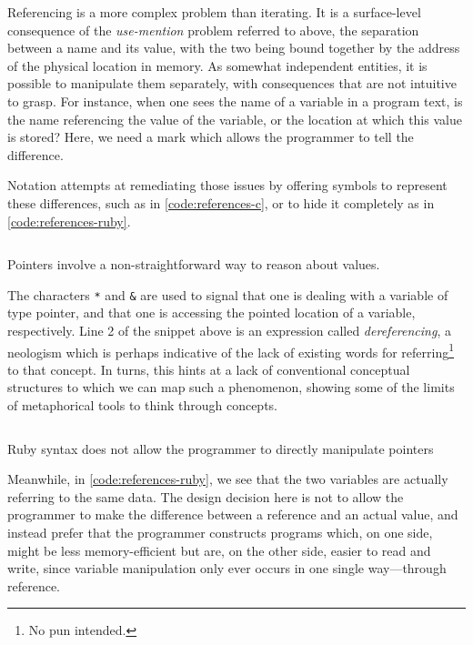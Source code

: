 Referencing is a more complex problem than iterating. It is a surface-level consequence of the \emph{use-mention} problem referred to above, the separation between a name and its value, with the two being bound together by the address of the physical location in memory. As somewhat independent entities, it is possible to manipulate them separately, with consequences that are not intuitive to grasp. For instance, when one sees the name of a variable in a program text, is the name referencing the value of the variable, or the location at which this value is stored? Here, we need a mark which allows the programmer to tell the difference.

Notation attempts at remediating those issues by offering symbols to represent these differences, such as in \ref{code:references-c}, or to hide it completely as in \ref{code:references-ruby}.

\begin{listing}
  \inputminted{c}{./corpus/references.c}
  \caption{Pointers involve a non-straightforward way to reason about values.}
  \label{code:references-c}
\end{listing}

The characters \lstinline{*} and \lstinline{&} are used to signal that one is dealing with a variable of type pointer, and that one is accessing the pointed location of a variable, respectively. Line 2 of the snippet above is an expression called \emph{dereferencing}, a neologism which is perhaps indicative of the lack of existing words for referring\footnote{No pun intended.} to that concept. In turns, this hints at a lack of conventional conceptual structures to which we can map such a phenomenon, showing some of the limits of metaphorical tools to think through concepts.

\begin{listing}
  \inputminted{python}{./corpus/references.rb}
  \caption{Ruby syntax does not allow the programmer to directly manipulate pointers}
  \label{code:references-ruby}
\end{listing}

Meanwhile, in \ref{code:references-ruby}, we see that the two variables are actually referring to the same data. The design decision here is not to allow the programmer to make the difference between a reference and an actual value, and instead prefer that the programmer constructs programs which, on one side, might be less memory-efficient but are, on the other side, easier to read and write, since variable manipulation only ever occurs in one single way—through reference.

